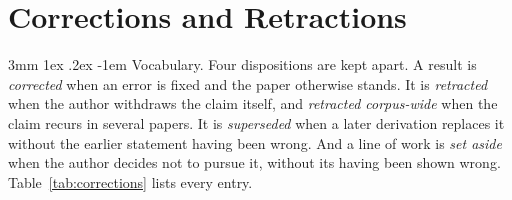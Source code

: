 \documentclass[%
 reprint, amsmath,amssymb, aps, prb, ]{revtex4-2}
\makeatletter
\numberwithin{equation}{section}
\renewcommand\paragraph{%
  \@startsection{paragraph}{4}{\z@}%
    {3mm \@plus 1ex \@minus .2ex}%
    {-1em}%
    {\normalfont\normalsize\itshape}}
\makeatother
\begin{document}
\section{Corrections and Retractions}
\label{sec:corrections}

\paragraph{Vocabulary.} Four dispositions are kept apart. A result is \emph{corrected} when an error is fixed and the paper otherwise stands. It is \emph{retracted} when the author withdraws the claim itself, and \emph{retracted corpus-wide} when the claim recurs in several papers. It is \emph{superseded} when a later derivation replaces it without the earlier statement having been wrong. And a line of work is \emph{set aside} when the author decides not to pursue it, without its having been shown wrong. Table~\ref{tab:corrections} lists every entry.
\end{document}
